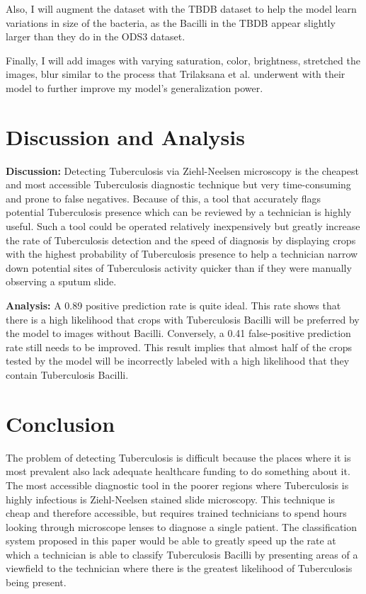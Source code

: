 \documentclass{article}
\begin{document}
Also, I will augment the dataset with the TBDB dataset to help the model learn variations in size
of the bacteria, as the Bacilli in the TBDB appear slightly larger than they do in the ODS3 dataset.

Finally, I will add images with varying saturation, color, brightness, stretched the images, blur similar to the process that
Trilaksana et al. underwent with their model to further improve my model's generalization power.





\section{Discussion and Analysis}
\textbf{Discussion:}
Detecting Tuberculosis via Ziehl-Neelsen microscopy is the cheapest and most accessible Tuberculosis diagnostic technique but very time-consuming and prone to false negatives. Because
of this, a tool that accurately flags potential Tuberculosis presence which can be reviewed by a technician
is highly useful. Such a tool could be operated relatively inexpensively but greatly increase the rate of
Tuberculosis detection and the speed of diagnosis by displaying crops with the highest probability of
Tuberculosis presence to help a technician narrow down potential sites of Tuberculosis activity quicker 
than if they were manually observing a sputum slide.

\textbf{Analysis:}
A 0.89 positive prediction rate is quite ideal. This rate shows that there is a high likelihood that crops with Tuberculosis Bacilli will be preferred
by the model to images without Bacilli. Conversely, a 0.41 false-positive prediction rate still needs to be improved. This result implies that almost half of the crops
tested by the model will be incorrectly labeled with a high likelihood that they contain Tuberculosis Bacilli.




\section{Conclusion}

The problem of detecting Tuberculosis is difficult because the places where it is most prevalent also lack adequate healthcare funding to do something about it.
The most accessible diagnostic tool in the poorer regions where Tuberculosis is highly infectious is Ziehl-Neelsen stained slide microscopy. This technique is 
cheap and therefore accessible, but requires trained technicians to spend hours looking through microscope lenses to diagnose a single patient. The classification
system proposed in this paper would be able to greatly speed up the rate at which a technician is able to classify Tuberculosis Bacilli by presenting areas of a
viewfield to the technician where there is the greatest likelihood of Tuberculosis being present.
\end{document}
